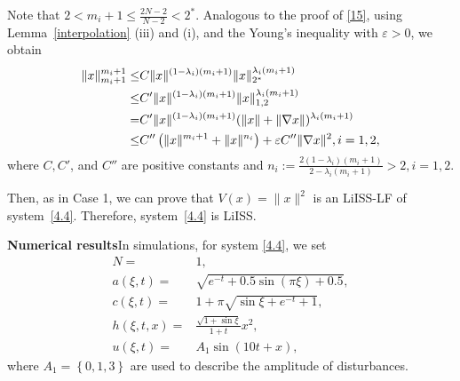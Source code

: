 \documentclass[onecolumn]{autart}
\newenvironment{proof of Prop.ODE}{{\it Proof of Proposition~\ref{Prop.ODE}:\enspace}}{\hfill $\blacksquare$\par}
\newenvironment{proof of PDE}{{\it Proof of Proposition \ref{Prop.8}:\enspace}}{\hfill $\blacksquare$\par}
\begin{document}
{\begin{proof of PDE}
	{Note that $2<m_i+1\leq \frac{2N-2}{N-2}< 2^*$.} Analogous to the proof of \eqref{15}, using   Lemma~\ref{interpolation}  (iii) and (i),  and the Young's inequality with $\varepsilon>0$, we obtain
	\begin{align*}
		\|x\|^{m_{i}+1}_{{m_{i}+1}}\leq &  C\|x\|^{(1-{\lambda_{i}})(m_{i}+1)}\|x\|_{2^{*}}^{{\lambda_{i}}(m_{i}+1)}\\
		\leq &  C'\|x\|^{(1-{\lambda_{i}})(m_{i}+1)}\|x\|_{1, 2}^{{\lambda_{i}}(m_{i}+1)}\\
		= & C'\|x\|^{(1-{\lambda_{i}})(m_{i}+1)}{(\|  x\|+\| \nabla x\|)^{{\lambda_{i}}(m_{i}+1)}}\notag\\
		\leq &   C'' \left(\|x\|^{ m_{i}+1 } +\|x\|^{{n_i}}\right)+ \varepsilon C'' \| \nabla x\|^{2}, i=1, 2,
	\end{align*}
	{where   $C,C'$, {and $C''$} are positive   constants    and $n_i:=\frac{2(1-{\lambda_{i}})(m_{i}+1)}{2-{\lambda_{i}}(m_{i}+1)}>2, i=1,2$.}
	
	Then, as in   Case 1, we can prove that   $V( {x})=\|x\|^{2}$ is an LiISS-LF of system~\eqref{4.4}. Therefore, system~\eqref{4.4} is LiISS. %
\end{proof of PDE}




\textbf{Numerical results}\quad In simulations, for system \eqref{4.4}, we set
\begin{align*}
	N=&1,\\
	a(\xi,t)=&\sqrt{e^{-t}+0.5\sin(\pi\xi)+0.5}, \\
	c(\xi,t)=&1+\pi\sqrt{\sin\xi+e^{-t}+1}, \\
	h(\xi,t,x)=&\frac{\sqrt{1+\sin\xi}}{1+t}x^2,\\
	u(\xi,t)=&A_1\sin(10t+x),
\end{align*}
where   $A_1=\left\{0,1,3\right\}$ are used to describe the amplitude of disturbances.


}
\end{document}
